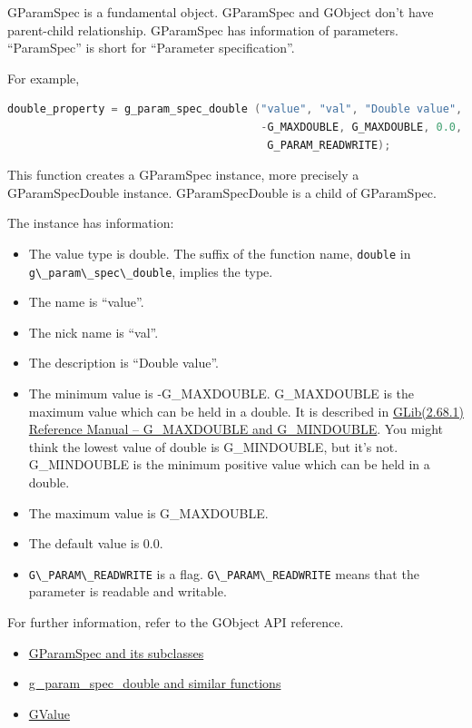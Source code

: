 GParamSpec is a fundamental object. GParamSpec and GObject don't have
parent-child relationship. GParamSpec has information of parameters.
``ParamSpec'' is short for ``Parameter specification''.

For example,

\begin{lstlisting}[language=C]
double_property = g_param_spec_double ("value", "val", "Double value",
                                       -G_MAXDOUBLE, G_MAXDOUBLE, 0.0,
                                        G_PARAM_READWRITE);
\end{lstlisting}

This function creates a GParamSpec instance, more precisely a
GParamSpecDouble instance. GParamSpecDouble is a child of GParamSpec.

The instance has information:

\begin{itemize}
\tightlist
\item
  The value type is double. The suffix of the function name,
  \passthrough{\lstinline!double!} in
  \passthrough{\lstinline!g\_param\_spec\_double!}, implies the type.
\item
  The name is ``value''.
\item
  The nick name is ``val''.
\item
  The description is ``Double value''.
\item
  The minimum value is -G\_MAXDOUBLE. G\_MAXDOUBLE is the maximum value
  which can be held in a double. It is described in
  \href{https://developer-old.gnome.org/glib/stable/glib-Basic-Types.html\#G-MINDOUBLE:CAPS}{GLib(2.68.1)
  Reference Manual -- G\_MAXDOUBLE and G\_MINDOUBLE}. You might think
  the lowest value of double is G\_MINDOUBLE, but it's not. G\_MINDOUBLE
  is the minimum positive value which can be held in a double.
\item
  The maximum value is G\_MAXDOUBLE.
\item
  The default value is 0.0.
\item
  \passthrough{\lstinline!G\_PARAM\_READWRITE!} is a flag.
  \passthrough{\lstinline!G\_PARAM\_READWRITE!} means that the parameter
  is readable and writable.
\end{itemize}

For further information, refer to the GObject API reference.

\begin{itemize}
\tightlist
\item
  \href{https://docs.gtk.org/gobject/index.html\#classes}{GParamSpec and
  its subclasses}
\item
  \href{https://docs.gtk.org/gobject/index.html\#functions}{g\_param\_spec\_double
  and similar functions}
\item
  \href{https://docs.gtk.org/gobject/struct.Value.html}{GValue}
\end{itemize}

